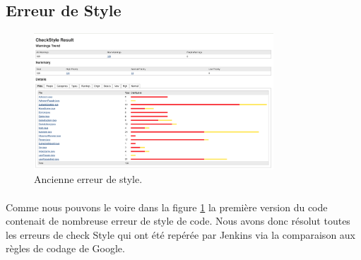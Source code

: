 \newpage
\subsection{Erreur de Style}
    \begin{figure}[h!]
        \centering
        \includegraphics[width=0.8\textwidth]{Figures/Old_CheckStyle.png}
        \caption{Ancienne erreur de style.}
        \label{fig:checkstyle}
    \end{figure}
    
    \paragraph{}
    Comme nous pouvons le voire dans la figure \ref{fig:checkstyle} la première version du code contenait de nombreuse erreur de style de code.
    Nous avons donc résolut toutes les erreurs de check Style qui ont été repérée par Jenkins via la comparaison aux règles de codage de Google.